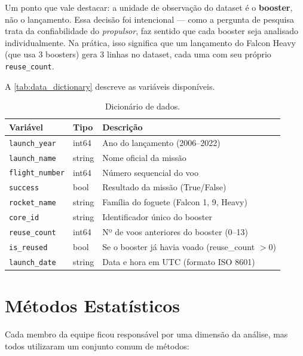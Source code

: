 Um ponto que vale destacar: a unidade de observação do dataset é o \textbf{booster}, não o lançamento. Essa decisão foi intencional — como a pergunta de pesquisa trata da confiabilidade do \textit{propulsor}, faz sentido que cada booster seja analisado individualmente. Na prática, isso significa que um lançamento do Falcon Heavy (que usa 3 boosters) gera 3 linhas no dataset, cada uma com seu próprio \texttt{reuse\_count}.

A \autoref{tab:data_dictionary} descreve as variáveis disponíveis.

\begin{table}[H]
\centering
\caption{Dicionário de dados.}
\label{tab:data_dictionary}
\begin{tabular}{llp{7cm}}
\toprule
\textbf{Variável} & \textbf{Tipo} & \textbf{Descrição} \\
\midrule
\texttt{launch\_year}   & int64   & Ano do lançamento (2006--2022) \\
\texttt{launch\_name}   & string  & Nome oficial da missão \\
\texttt{flight\_number} & int64   & Número sequencial do voo \\
\texttt{success}        & bool    & Resultado da missão (True/False) \\
\texttt{rocket\_name}   & string  & Família do foguete (Falcon 1, 9, Heavy) \\
\texttt{core\_id}       & string  & Identificador único do booster \\
\texttt{reuse\_count}   & int64   & Nº de voos anteriores do booster (0--13) \\
\texttt{is\_reused}     & bool    & Se o booster já havia voado (reuse\_count $> 0$) \\
\texttt{launch\_date}   & string  & Data e hora em UTC (formato ISO 8601) \\
\bottomrule
\end{tabular}
\end{table}

\section{Métodos Estatísticos}

Cada membro da equipe ficou responsável por uma dimensão da análise, mas todos utilizaram um conjunto comum de métodos:

